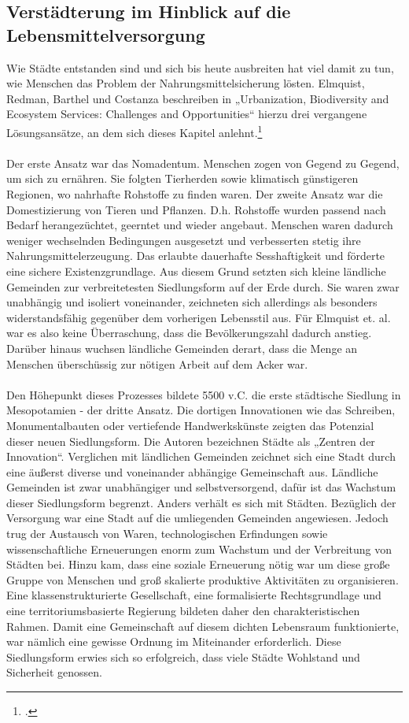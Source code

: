 \documentclass{scrartcl}
\begin{document}
\subsection{Verstädterung im Hinblick auf die Lebensmittelversorgung} \label{Vergangenheit der Urbanen Landwirtschaft}
Wie Städte entstanden sind und sich bis heute ausbreiten hat viel damit zu tun, wie Menschen das Problem der Nahrungsmittelsicherung lösten. Elmquist, Redman, Barthel und Costanza beschreiben in „Urbanization, Biodiversity and Ecosystem Services: Challenges and Opportunities“ hierzu drei vergangene Lösungsansätze, an dem sich dieses Kapitel anlehnt.\footcite[S.14ff]{Elmqvist2013} 
\\
\\ 
Der erste Ansatz war das Nomadentum. Menschen zogen von Gegend zu Gegend, um sich zu ernähren. Sie folgten Tierherden sowie klimatisch günstigeren Regionen, wo nahrhafte Rohstoffe zu finden waren. Der zweite Ansatz war die Domestizierung von Tieren und Pflanzen. D.h. Rohstoffe wurden passend nach Bedarf herangezüchtet, geerntet und wieder angebaut. Menschen waren dadurch weniger wechselnden Bedingungen ausgesetzt und verbesserten stetig ihre Nahrungsmittelerzeugung. Das erlaubte dauerhafte Sesshaftigkeit und förderte eine sichere Existenzgrundlage. Aus diesem Grund setzten sich kleine ländliche Gemeinden zur verbreitetesten Siedlungsform auf der Erde durch. Sie waren zwar unabhängig und isoliert voneinander, zeichneten sich allerdings als besonders widerstandsfähig gegenüber dem vorherigen Lebensstil aus. Für Elmquist et. al. war es also keine Überraschung, dass die Bevölkerungszahl dadurch anstieg. Darüber hinaus wuchsen ländliche Gemeinden derart, dass die Menge an Menschen überschüssig zur nötigen Arbeit auf dem Acker war.\\
\\
Den Höhepunkt dieses Prozesses bildete 5500 v.C. die erste städtische Siedlung in Mesopotamien - der dritte Ansatz. Die dortigen Innovationen wie das Schreiben, Monumentalbauten oder vertiefende Handwerkskünste zeigten das Potenzial dieser neuen Siedlungsform. Die Autoren bezeichnen Städte als „Zentren der Innovation“. Verglichen mit ländlichen Gemeinden zeichnet sich eine Stadt durch eine äußerst diverse und voneinander abhängige Gemeinschaft aus. Ländliche Gemeinden ist zwar unabhängiger und selbstversorgend, dafür ist das Wachstum dieser Siedlungsform begrenzt. Anders verhält es sich mit Städten. Bezüglich der Versorgung war eine Stadt auf die umliegenden Gemeinden angewiesen. Jedoch trug der Austausch von Waren, technologischen Erfindungen sowie wissenschaftliche Erneuerungen enorm zum Wachstum und der Verbreitung von Städten bei. Hinzu kam, dass eine soziale Erneuerung nötig war um diese große Gruppe von Menschen und groß skalierte produktive Aktivitäten zu organisieren. Eine klassenstrukturierte Gesellschaft, eine formalisierte Rechtsgrundlage und eine territoriumsbasierte Regierung bildeten daher den charakteristischen Rahmen. Damit eine Gemeinschaft auf diesem dichten Lebensraum funktionierte, war nämlich eine gewisse Ordnung im Miteinander erforderlich. Diese Siedlungsform erwies sich so erfolgreich, dass viele Städte Wohlstand und Sicherheit genossen. 
\end{document}
